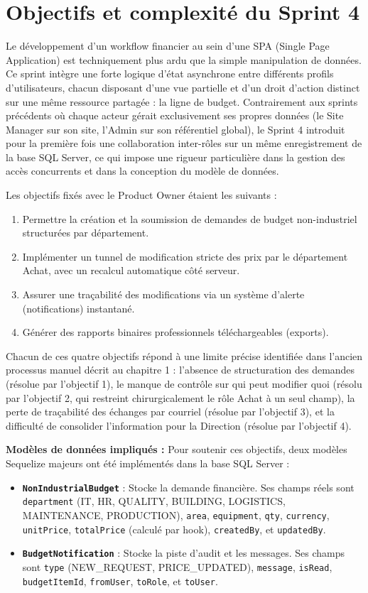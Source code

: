 \section{Objectifs et complexité du Sprint 4}
Le développement d'un workflow financier au sein d'une SPA (Single Page Application) est techniquement plus ardu que la simple manipulation de données. Ce sprint intègre une forte logique d'état asynchrone entre différents profils d'utilisateurs, chacun disposant d'une vue partielle et d'un droit d'action distinct sur une même ressource partagée : la ligne de budget. Contrairement aux sprints précédents où chaque acteur gérait exclusivement ses propres données (le Site Manager sur son site, l'Admin sur son référentiel global), le Sprint 4 introduit pour la première fois une collaboration inter-rôles sur un même enregistrement de la base SQL Server, ce qui impose une rigueur particulière dans la gestion des accès concurrents et dans la conception du modèle de données.

Les objectifs fixés avec le Product Owner étaient les suivants :
\begin{enumerate}
    \item Permettre la création et la soumission de demandes de budget non-industriel structurées par département.
    \item Implémenter un tunnel de modification stricte des prix par le département Achat, avec un recalcul automatique côté serveur.
    \item Assurer une traçabilité des modifications via un système d'alerte (notifications) instantané.
    \item Générer des rapports binaires professionnels téléchargeables (exports).
\end{enumerate}

Chacun de ces quatre objectifs répond à une limite précise identifiée dans l'ancien processus manuel décrit au chapitre 1 : l'absence de structuration des demandes (résolue par l'objectif 1), le manque de contrôle sur qui peut modifier quoi (résolu par l'objectif 2, qui restreint chirurgicalement le rôle Achat à un seul champ), la perte de traçabilité des échanges par courriel (résolue par l'objectif 3), et la difficulté de consolider l'information pour la Direction (résolue par l'objectif 4).

\textbf{Modèles de données impliqués :}
Pour soutenir ces objectifs, deux modèles Sequelize majeurs ont été implémentés dans la base SQL Server :
\begin{itemize}
    \item \textbf{\texttt{NonIndustrialBudget}} : Stocke la demande financière. Ses champs réels sont \texttt{department} (IT, HR, QUALITY, BUILDING, LOGISTICS, MAINTENANCE, PRODUCTION), \texttt{area}, \texttt{equipment}, \texttt{qty}, \texttt{currency}, \texttt{unitPrice}, \texttt{totalPrice} (calculé par hook), \texttt{createdBy}, et \texttt{updatedBy}.
    \item \textbf{\texttt{BudgetNotification}} : Stocke la piste d'audit et les messages. Ses champs sont \texttt{type} (NEW\_REQUEST, PRICE\_UPDATED), \texttt{message}, \texttt{isRead}, \texttt{budgetItemId}, \texttt{fromUser}, \texttt{toRole}, et \texttt{toUser}.
\end{itemize}

